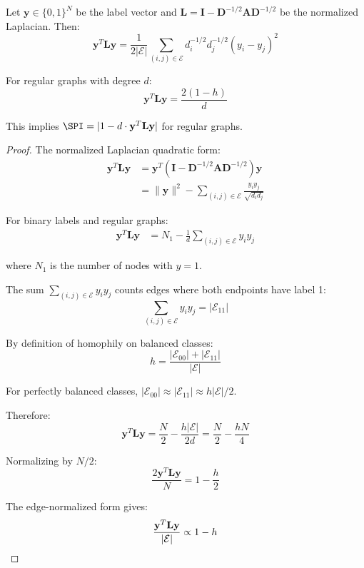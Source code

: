 \begin{proposition}
\label{prop:spi_laplacian}
Let $\mathbf{y} \in \{0, 1\}^N$ be the label vector and $\mathbf{L} = \mathbf{I} - \mathbf{D}^{-1/2}\mathbf{A}\mathbf{D}^{-1/2}$ be the normalized Laplacian. Then:
\begin{equation}
\mathbf{y}^T \mathbf{L} \mathbf{y} = \frac{1}{2|\mathcal{E}|}\sum_{(i,j) \in \mathcal{E}} d_i^{-1/2}d_j^{-1/2}(y_i - y_j)^2
\end{equation}

For regular graphs with degree $d$:
\begin{equation}
\mathbf{y}^T \mathbf{L} \mathbf{y} = \frac{2(1-h)}{d}
\end{equation}

This implies $\SPI = |1 - d \cdot \mathbf{y}^T \mathbf{L} \mathbf{y}|$ for regular graphs.
\end{proposition}

\begin{proof}
The normalized Laplacian quadratic form:
\begin{align}
\mathbf{y}^T \mathbf{L} \mathbf{y} &= \mathbf{y}^T (\mathbf{I} - \mathbf{D}^{-1/2}\mathbf{A}\mathbf{D}^{-1/2}) \mathbf{y} \\
&= \|\mathbf{y}\|^2 - \sum_{(i,j) \in \mathcal{E}} \frac{y_i y_j}{\sqrt{d_i d_j}}
\end{align}

For binary labels and regular graphs:
\begin{align}
\mathbf{y}^T \mathbf{L} \mathbf{y} &= N_1 - \frac{1}{d}\sum_{(i,j) \in \mathcal{E}} y_i y_j
\end{align}

where $N_1$ is the number of nodes with $y = 1$.

The sum $\sum_{(i,j) \in \mathcal{E}} y_i y_j$ counts edges where both endpoints have label 1:
\begin{equation}
\sum_{(i,j) \in \mathcal{E}} y_i y_j = |\mathcal{E}_{11}|
\end{equation}

By definition of homophily on balanced classes:
\begin{equation}
h = \frac{|\mathcal{E}_{00}| + |\mathcal{E}_{11}|}{|\mathcal{E}|}
\end{equation}

For perfectly balanced classes, $|\mathcal{E}_{00}| \approx |\mathcal{E}_{11}| \approx h|\mathcal{E}|/2$.

Therefore:
\begin{equation}
\mathbf{y}^T \mathbf{L} \mathbf{y} = \frac{N}{2} - \frac{h|\mathcal{E}|}{2d} = \frac{N}{2} - \frac{hN}{4}
\end{equation}

Normalizing by $N/2$:
\begin{equation}
\frac{2\mathbf{y}^T \mathbf{L} \mathbf{y}}{N} = 1 - \frac{h}{2}
\end{equation}

The edge-normalized form gives:
\begin{equation}
\frac{\mathbf{y}^T \mathbf{L} \mathbf{y}}{|\mathcal{E}|} \propto 1 - h \qedhere
\end{equation}
\end{proof}

